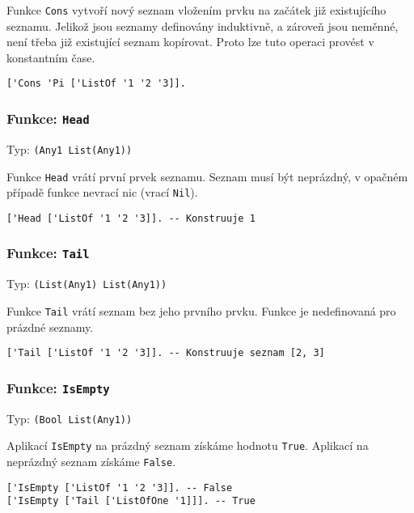 Funkce \lstinline{Cons} vytvoří nový seznam vložením prvku na začátek již existujícího seznamu.
Jelikož jsou seznamy definovány induktivně, a zároveň jsou neměnné, není třeba již existující seznam
kopírovat. Proto lze tuto operaci provést v konstantním čase.

\begin{lstlisting}[caption={Ukázka využití Cons}]
['Cons 'Pi ['ListOf '1 '2 '3]].
\end{lstlisting}

\subsubsection*{Funkce: \lstinline|Head|}
Typ: \lstinline{(Any1 List(Any1))}

Funkce \lstinline{Head} vrátí první prvek seznamu. Seznam musí být neprázdný, v opačném případě
funkce nevrací nic (vrací \lstinline{Nil}).

\begin{lstlisting}[caption={Ukázka využití Head}]
['Head ['ListOf '1 '2 '3]]. -- Konstruuje 1
\end{lstlisting}

\subsubsection*{Funkce: \lstinline|Tail|}
Typ: \lstinline{(List(Any1) List(Any1))}

Funkce \lstinline{Tail} vrátí seznam bez jeho prvního prvku. Funkce je nedefinovaná pro prázdné
seznamy.

\begin{lstlisting}[caption={Ukázka využití Head}]
['Tail ['ListOf '1 '2 '3]]. -- Konstruuje seznam [2, 3]
\end{lstlisting}

\subsubsection*{Funkce: \lstinline|IsEmpty|}
Typ: \lstinline{(Bool List(Any1))}

Aplikací \lstinline{IsEmpty} na prázdný seznam získáme hodnotu \lstinline{True}. Aplikací
na neprázdný seznam získáme \lstinline{False}.

\begin{lstlisting}[caption={Ukázka využití IsEmpty}]
['IsEmpty ['ListOf '1 '2 '3]]. -- False
['IsEmpty ['Tail ['ListOfOne '1]]]. -- True
\end{lstlisting}

